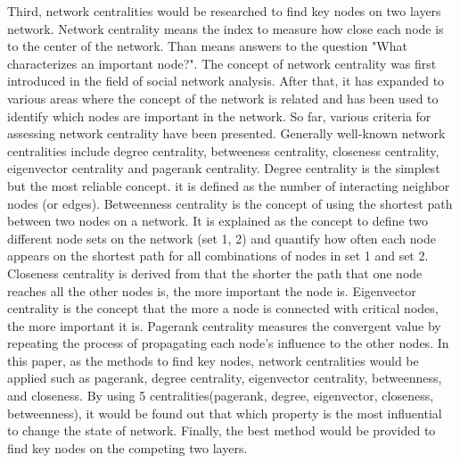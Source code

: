 Third, network centralities would be researched to find key nodes on two layers network. Network centrality means the index to measure how close each node is to the center of the network. Than means answers to the question "What characterizes an important node?". The concept of network centrality was first introduced in the field of social network analysis.\parencite{freeman1979} After that, it has expanded to various areas where the concept of the network is related and has been used to identify which nodes are important in the network. So far, various criteria for assessing network centrality have been presented. Generally well-known network centralities include degree centrality, betweeness centrality, closeness centrality, eigenvector centrality and pagerank centrality.\parencite{koschutzki2008}
Degree centrality is the simplest but the most reliable concept. it is defined as the number of interacting neighbor nodes (or edges). Betweenness centrality is the concept of using the shortest path between two nodes on a network. It is explained as the concept to  define two different node sets on the network (set 1, 2) and quantify how often each node appears on the shortest path for all combinations of nodes in set 1 and set 2. Closeness centrality is derived from that the shorter the path that one node reaches all the other nodes is, the more important the node is. Eigenvector centrality is the concept that the more a node is connected with critical nodes, the more important it is. Pagerank centrality measures the convergent value by repeating the process of propagating each node's influence to the other nodes.    
In this paper, as the methods to find key nodes, network centralities would be applied such as pagerank, degree centrality, eigenvector centrality, betweenness, and closeness.\parencite{francisco2019, bianconi2018} By using 5 centralities(pagerank, degree, eigenvector, closeness, betweenness), it would be found out that which property is the most influential to change the state of network. Finally, the best method would be provided to find key nodes on the competing two layers. 

